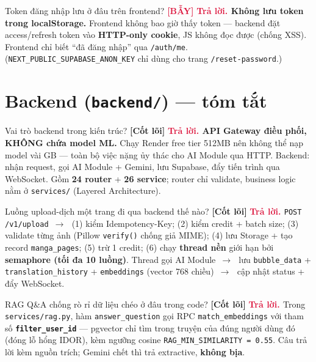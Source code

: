 \documentclass[11pt]{article}
\newcommand{\arr}{\,\ensuremath{\rightarrow}\,}
\newcommand{\code}[1]{\texttt{\small #1}}
\newcommand{\B}[1]{\textbf{#1}}
\newcommand{\tagCore}{\textcolor{steel}{\footnotesize\textbf{[Cốt lõi]}}}
\newcommand{\tagTrap}{\textcolor{crimson}{\footnotesize\textbf{[BẪY]}}}
\newcommand{\A}{\textbf{\textcolor{crimson}{Trả lời. }}}
\begin{document}
\begin{qa}{Token đăng nhập lưu ở đâu trên frontend? \tagTrap}
\A \B{Không lưu token trong localStorage.} Frontend không bao giờ thấy token --- backend đặt access/refresh token vào \B{HTTP-only cookie}, JS không đọc được (chống XSS). Frontend chỉ biết ``đã đăng nhập'' qua \code{/auth/me}. (\code{NEXT\_PUBLIC\_SUPABASE\_ANON\_KEY} chỉ dùng cho trang \code{/reset-password}.)
\end{qa}

\section{Backend (\texttt{backend/}) --- tóm tắt}

\begin{qa}{Vai trò backend trong kiến trúc? \tagCore}
\A \B{API Gateway điều phối, KHÔNG chứa model ML.} Chạy Render free tier 512MB nên không thể nạp model vài GB --- toàn bộ việc nặng ủy thác cho AI Module qua HTTP. Backend: nhận request, gọi AI Module + Gemini, lưu Supabase, đẩy tiến trình qua WebSocket. Gồm \B{24 router} + \B{26 service}; router chỉ validate, business logic nằm ở \code{services/} (Layered Architecture).
\end{qa}

\begin{qa}{Luồng upload-dịch một trang đi qua backend thế nào? \tagCore}
\A \code{POST /v1/upload} \arr\ (1) kiểm Idempotency-Key; (2) kiểm credit + batch size; (3) validate từng ảnh (Pillow \code{verify()} chống giả MIME); (4) lưu Storage + tạo record \code{manga\_pages}; (5) trừ 1 credit; (6) chạy \B{thread nền} giới hạn bởi \B{semaphore (tối đa 10 luồng)}. Thread gọi AI Module \arr\ lưu \code{bubble\_data} + \code{translation\_history} + \code{embeddings} (vector 768 chiều) \arr\ cập nhật status + đẩy WebSocket.
\end{qa}

\begin{qa}{RAG Q\&A chống rò rỉ dữ liệu chéo ở đâu trong code? \tagCore}
\A Trong \code{services/rag.py}, hàm \code{answer\_question} gọi RPC \code{match\_embeddings} với tham số \B{\code{filter\_user\_id}} --- pgvector chỉ tìm trong truyện của đúng người dùng đó (đóng lỗ hổng IDOR), kèm ngưỡng cosine \code{RAG\_MIN\_SIMILARITY = 0.55}. Câu trả lời kèm nguồn trích; Gemini chết thì trả extractive, \B{không bịa}.
\end{qa}

\end{document}
